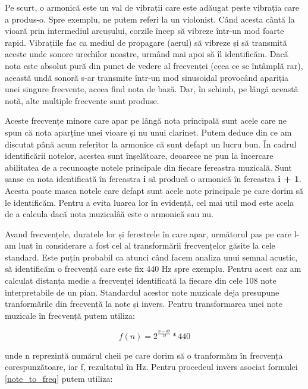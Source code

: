 \documentclass[a4paper,12pt]{report}
\begin{document}
    Pe scurt, o armonică este un val de vibrații care este adăugat peste vibrația care a produs-o. Spre exemplu, ne putem referi la un violonist. Când acesta cântă la vioară prin intermediul arcușului, corzile încep să vibreze într-un mod foarte rapid. Vibrațiile fac ca mediul de propagare (aerul) să vibreze și să transmită aceste unde sonore urechilor noastre, urmând mai apoi să îl identificăm. Dacă nota este absolut pură din punct de vedere al frecvenței (ceea ce se întâmplă rar), această undă sonoră s-ar transmite într-un mod sinusoidal provocând apariția unei singure frecvențe, aceea find nota de bază. Dar, în schimb, pe lângă această notă, alte multiple frecvențe sunt produse. 
    
    Aceste frecvențe minore care apar pe lângă nota principală sunt acele care ne spun că nota aparține unei vioare și nu unui clarinet. Putem deduce din ce am discutat până acum referitor la armonice că sunt defapt un lucru bun. În cadrul identificării notelor, acestea sunt înșelătoare, deoarece ne pun la încercare abilitatea de a recunoaște notele principale din fiecare fereastra muzicală. Sunt șanse ca nota identificată în fereastra \textbf{i} să producă o armonică în fereastra \textbf{i + 1}. Acesta poate masca notele care defapt sunt acele note principale pe care dorim să le identificăm. Pentru a evita luarea lor în evidență, cel mai util mod este acela de a calcula dacă nota muzicalâă este o armonică sau nu.
    
    Avand frecvențele, duratele lor și ferestrele în care apar, următorul pas pe care l-am luat în considerare a fost cel al transformării frecvențelor găsite la cele standard. Este puțin probabil ca atunci când facem analiza unui semnal acustic, să identificăm o frecvență care este fix 440 Hz spre exemplu. Pentru acest caz am calculat distanța medie a frecvenței identificată la fiecare din cele 108 note interpretabile de un pian. Standardul acestor note muzicale deja presupune tranformările din frecvență la note și invers. Pentru transformarea unei note muzicale în frecvență putem utiliza:
    
    \begin{equation}
  		\label{note_to_freq}
    	f(n)= 2^{\frac{n-49}{12}}*440
    \end{equation}
    
    unde n reprezintă numărul cheii pe care dorim să o tranformăm în frecvența corespunzătoare, iar f, rezultatul în Hz. Pentru procedeul invers asociat formulei \ref{note_to_freq} putem utiliza:
    
\end{document}

